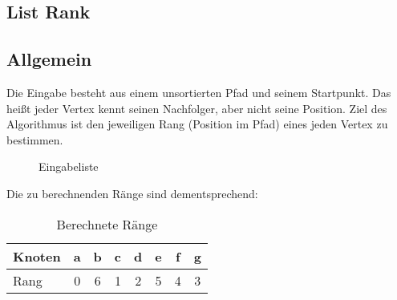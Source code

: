 \documentclass[a0,portrait]{a0poster}
\begin{document}
\begin{multicols}{2}
        
\section*{List Rank}

\subsection*{Allgemein}
       
Die Eingabe besteht aus einem unsortierten Pfad und seinem Startpunkt. Das heißt
jeder Vertex kennt seinen Nachfolger, aber nicht seine Position. Ziel des
Algorithmus ist den jeweiligen Rang (Position im Pfad) eines jeden Vertex zu
bestimmen.

 \begin{figure}[H]
\caption{Eingabeliste}
\label{ulist}
\end{figure}
    
Die zu berechnenden Ränge sind dementsprechend:

\begin{table}[H]          %
\centering
\begin{tabular*}{\linewidth}{@{\extracolsep{\fill}}lccccccc}
\hline
\hline
\rule[-7pt]{0pt}{23pt}  Knoten & a & b & c & d &e & f & g\\
\hline
\rule[-6pt]{0pt}{21pt}   Rang & 0 & 6 & 1 & 2 & 5 & 4 & 3\\
\hline
\hline
\end{tabular*}  
\caption[]{Berechnete Ränge} 
\label{Raumtemperatur}                             %
\end{table}
       

\end{multicols}
\end{document}
